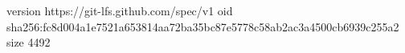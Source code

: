 version https://git-lfs.github.com/spec/v1
oid sha256:fc8d004a1e7521a653814aa72ba35bc87e5778c58ab2ac3a4500cb6939c255a2
size 4492
